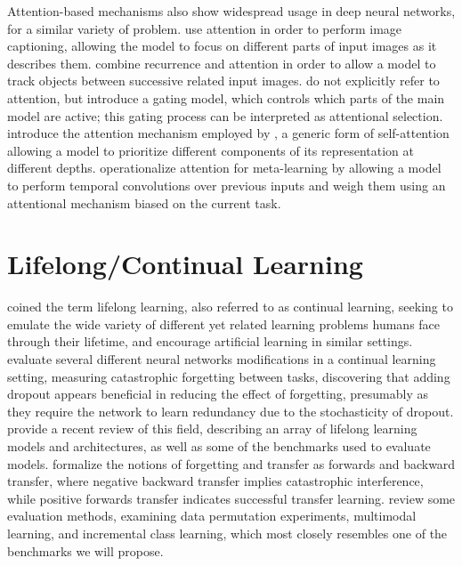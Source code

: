 Attention-based mechanisms also show widespread usage in deep neural networks, for a similar variety of problem. \textcite{Xu2015} use attention in order to perform image captioning, allowing the model to focus on different parts of input images as it describes them. \textcite{Kahou2017} combine recurrence and attention in order to allow a model to track objects between successive related input images. \textcite{Chen} do not explicitly refer to attention, but introduce a gating model, which controls which parts of the main model are active; this gating process can be interpreted as attentional selection. \textcite{Vaswani2017} introduce the attention mechanism employed by \textcite{Santoro2018}, a generic form of self-attention allowing a model to prioritize different components of its representation at different depths. \textcite{Mishra2018} operationalize attention for meta-learning by allowing a model to perform temporal convolutions over previous inputs and weigh them using an attentional mechanism biased on the current task. 

\section{Lifelong/Continual Learning}
\textcite{Thrun1995} coined the term lifelong learning, also referred to as continual learning, seeking to emulate the wide variety of different yet related learning problems humans face through their lifetime, and encourage artificial learning in similar settings. \textcite{Goodfellow2015} evaluate several different neural networks modifications in a continual learning setting, measuring catastrophic forgetting between tasks, discovering that adding dropout appears beneficial in reducing the effect of forgetting, presumably as they require the network to learn redundancy due to the stochasticity of dropout. \textcite{Parisi2019} provide a recent review of this field, describing an array of lifelong learning models and architectures, as well as some of the benchmarks used to evaluate models. \textcite{Lopez-Paz2017} formalize the notions of forgetting and transfer as forwards and backward transfer, where negative backward transfer implies catastrophic interference, while positive forwards transfer indicates successful transfer learning. \textcite{Kemker2017a} review some evaluation methods, examining data permutation experiments, multimodal learning, and incremental class learning, which most closely resembles one of the benchmarks we will propose. 

